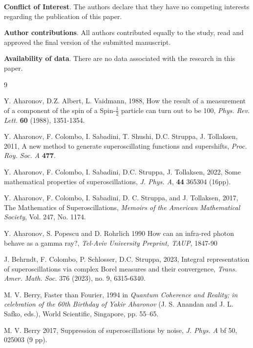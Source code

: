 \documentclass[reqno,11pt]{amsart}
\theoremstyle{definition}
\begin{document}
\medskip\medskip
{\bf Conflict of Interest}. The authors declare that they have no competing interests regarding the publication of this paper.

{\bf Author contributions}. All authors contributed equally to the study, read and approved the final version of the submitted manuscript.

{\bf Availability of data}. There are no data associated with the research in this paper.

\begin{thebibliography}{9}

 Y. Aharonov, D.Z. Albert, L. Vaidmann, 1988, How the result of a measurement of a component of the spin of a Spin-$\frac{1}{2}$ particle can turn out to be 100, \textit{Phys. Rev. Lett.} \textbf{60} (1988), 1351-1354.

 Y. Aharonov, F. Colombo, I. Sabadini, T. Shushi, D.C. Struppa, J. Tollaksen, 2011, A new method to generate superoscillating functions and supershifts, \textit{Proc. Roy. Soc. A} \textbf{477}.




Y. Aharonov,  F. Colombo,  I. Sabadini, D.C. Struppa, J. Tollaksen, 2022,
Some mathematical properties of superoscillations, \textit{
  J. Phys. A}, {\bf 44} 365304 (16pp).


Y. Aharonov, F. Colombo, I. Sabadini, D. C. Struppa, and J. Tollaksen, 2017,
The Mathematics of Superoscillations,
\textit{Memoirs of the American Mathematical Society}, Vol. 247, No. 1174.

Y. Aharonov, S. Popescu and D. Rohrlich 1990 How can an infra-red photon behave as a gamma ray?, \textit{Tel-Aviv University Preprint, TAUP}, 1847-90


 J. Behrndt, F. Colombo, P. Schlosser, D.C. Struppa, 2023, Integral representation of superoscillations via complex Borel measures and their convergence, {\em Trans. Amer. Math. Soc.} 376 (2023), no. 9, 6315-6340.

M. V. Berry,
Faster than Fourier, 1994
in \textit{Quantum Coherence and Reality; in celebration of the 60th Birthday of Yakir Aharonov} (J. S. Anandan and J. L. Safko, eds.),
World Scientific, Singapore, pp. 55--65.


M. V. Berry 2017, Suppression of superoscillations by noise, \textit{J. Phys. A} {bf 50}, 025003 (9 pp).





\end{thebibliography}
\end{document}
